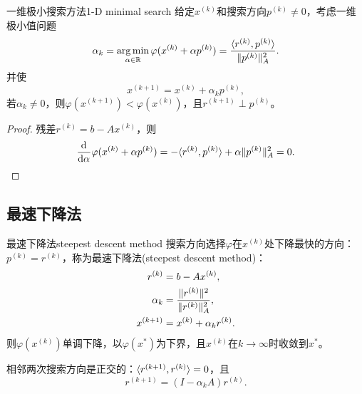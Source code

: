 \begin{theorem}
    {一维极小搜索方法}{1-D minimal search}
    给定$x^{(k)}$和搜索方向$p^{(k)} \neq 0$，考虑一维极小值问题
    \begin{equation}
        \label{eqn:alphak}
        \alpha_k = \operatorname*{arg\,min}_{\alpha\in\mathbb{R}}\varphi(x^{(k)} + \alpha p^{(k)}) = \frac{\langle r^{(k)},p^{(k)}\rangle}{\lVert p^{(k)}\rVert_A^2}.
    \end{equation}
    并使
    \begin{equation}
        x^{(k+1)} = x^{(k)} + \alpha_kp^{(k)},
    \end{equation}
    若$\alpha_k \neq 0$，则$\varphi(x^{(k+1)}) < \varphi(x^{(k)})$，且$r^{(k+1)} \perp p^{(k)}$。
\end{theorem}

\begin{proof}
    残差$r^{(k)} = b - Ax^{(k)}$，则
    \[
        \frac{\mathop{}\!\mathrm{d}^{}}{\mathrm{d}{\alpha}^{}}\varphi(x^{(k)} + \alpha p^{(k)}) = -\langle r^{(k)},p^{(k)}\rangle + \alpha\lVert p^{(k)}\rVert_A^2 = 0.
        \qedhere
    \]
\end{proof}

\subsection{最速下降法}
\label{ssec:steepest descent method}

\begin{theorem}
    {最速下降法}{steepest descent method}
    搜索方向选择$\varphi$在$x^{(k)}$处下降最快的方向：$p^{(k)} = r^{(k)}$，称为最速下降法(steepest descent method)：
    \begin{subequations}
        \begin{align}
            r^{(k)} &= b - Ax^{(k)},\\
            \alpha_k &= \frac{\lVert r^{(k)}\rVert^2}{\lVert r^{(k)}\rVert_A^2},\\
            x^{(k+1)} &= x^{(k)} + \alpha_kr^{(k)}.
        \end{align}
    \end{subequations}
    则$\varphi(x^{(k)})$单调下降，以$\varphi(x^*)$为下界，且$x^{(k)}$在$k \to \infty$时收敛到$x^*$。
\end{theorem}

\begin{corollary}
    相邻两次搜索方向是正交的：$\langle r^{(k+1)},r^{(k)}\rangle = 0$，且
    \begin{equation}\label{eq:na-steepest-residual-update}
        r^{(k+1)} = (I - \alpha_k A)r^{(k)}.
    \end{equation}
\end{corollary}

